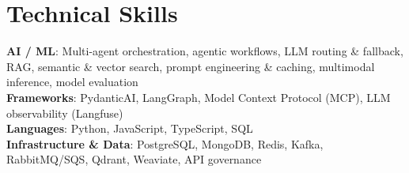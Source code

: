 \documentclass[letterpaper,11pt]{article}
\begin{document}
\section{Technical Skills}
 \begin{itemize}[leftmargin=0.15in, label={}]
    \small{\item{
     \textbf{AI / ML}{: Multi-agent orchestration, agentic workflows, LLM routing \& fallback, RAG, semantic \& vector search, prompt engineering \& caching, multimodal inference, model evaluation} \\
     \textbf{Frameworks}{: PydanticAI, LangGraph, Model Context Protocol (MCP), LLM observability (Langfuse)} \\
     \textbf{Languages}{: Python, JavaScript, TypeScript, SQL} \\
     \textbf{Infrastructure \& Data}{: PostgreSQL, MongoDB, Redis, Kafka, RabbitMQ/SQS, Qdrant, Weaviate, API governance} \\
    }}
 \end{itemize}
\end{document}
